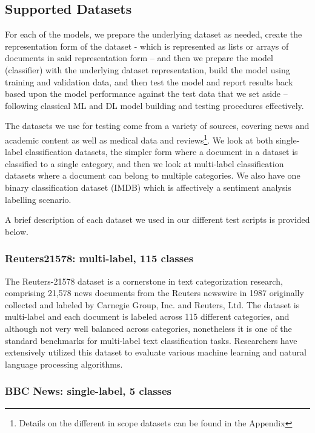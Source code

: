 \documentclass[final]{clv2025}
\begin{document}
\subsection{Supported Datasets}
For each of the models, we prepare the underlying dataset as needed, create the representation form of the dataset - which is represented as lists or arrays of documents in said representation form – and then we prepare the model (classifier) with the underlying dataset representation, build the model using training and validation data, and then test the model and report results back based upon the model performance against the test data that we set aside – following classical ML and DL model building and testing procedures effectively.

The datasets we use for testing come from a variety of sources, covering news and academic content as well as medical data and reviews\footnote{Details on the different in scope datasets can be found in the Appendix}.  We look at both single-label classification datasets, the simpler form where a document in a dataset is classified to a single category, and then we look at multi-label classification datasets where a document can belong to multiple categories. We also have one binary classification dataset (IMDB) which is affectively a sentiment analysis labelling scenario. 

A brief description of each dataset we used in our different test scripts is provided below.

\subsubsection{Reuters21578: multi-label, 115 classes}
The Reuters-21578 dataset \cite{lewis1987reuters} is a cornerstone in text categorization research, comprising 21,578 news documents from the Reuters newswire in 1987 originally collected and labeled by Carnegie Group, Inc. and Reuters, Ltd. The dataset is multi-label and each document is labeled across 115 different categories, and although not very well balanced across categories, nonetheless it is one of the standard benchmarks for multi-label text classification tasks. Researchers have extensively utilized this dataset to evaluate various machine learning and natural language processing algorithms. 

\subsubsection{BBC News: single-label, 5 classes}
\end{document}
